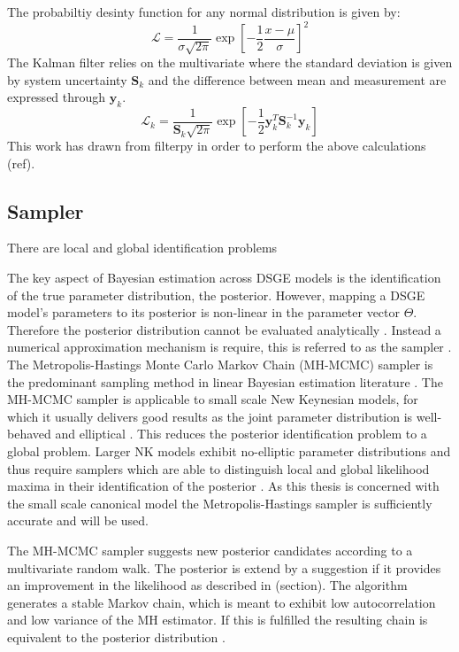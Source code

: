 \documentclass[12pt,a4paper,english]{article} %
\newcommand{\matr}[1]{\mathbf{#1}} %
\newcommand{\Lagr}{\mathcal{L}} %
\begin{document}
	The probabiltiy desinty function for any normal distribution is given by: 
	\[
	\Lagr = \frac{1}{\sigma \sqrt{2 \pi}} \exp [- \frac{1}{2} \frac{x - \mu}{\sigma}]^2
	\]
	The Kalman filter relies on the multivariate where the standard deviation is given by system uncertainty $\matr{S}_k$ and the difference between mean and measurement are expressed through $\matr{y}_k$.
	\[
		\Lagr_k = \frac{1}{\matr{S}_k \sqrt{2 \pi}} \exp [- \frac{1}{2} \matr{y}_k^{T} \matr{S}_{k}^{-1} \matr{y}_k]
	\]
	This work has drawn from filterpy in order to perform the above calculations (ref).
	
	\subsection{Sampler}
	
	There are local and global identification problems 
	
	The key aspect of Bayesian estimation across DSGE models is the identification of the true parameter distribution, the posterior. However, mapping a DSGE model's parameters to its posterior is non-linear in the parameter vector $\Theta$. Therefore the posterior distribution cannot be evaluated analytically \cite{herbst_bayesian_2016}. Instead a numerical approximation mechanism is require, this is referred to as the sampler \cite{guerron-quintana_bayesian_2013}. The Metropolis-Hastings Monte Carlo Markov Chain (MH-MCMC) sampler is the predominant sampling method in linear Bayesian estimation literature \cite{guerron-quintana_bayesian_2013}. The MH-MCMC sampler is applicable to small scale New Keynesian models, for which it usually delivers good results as the joint parameter distribution is well-behaved and elliptical \cite{herbst_bayesian_2016}. This reduces the posterior identification problem to a global problem. Larger NK models exhibit no-elliptic parameter distributions and thus require samplers which are able to distinguish local and global likelihood maxima in their identification of the posterior \cite{herbst_bayesian_2016}. As this thesis is concerned with the small scale canonical model the Metropolis-Hastings sampler is sufficiently accurate and will be used.
	
	The MH-MCMC sampler suggests new posterior candidates according to a multivariate random walk. The posterior is extend by a suggestion if it provides an improvement in the likelihood as described in (section). The algorithm generates a stable Markov chain, which is meant to exhibit low autocorrelation and low variance of the MH estimator. If this is fulfilled the resulting chain is equivalent to the posterior distribution \cite{herbst_bayesian_2016}.	
		
\end{document}
